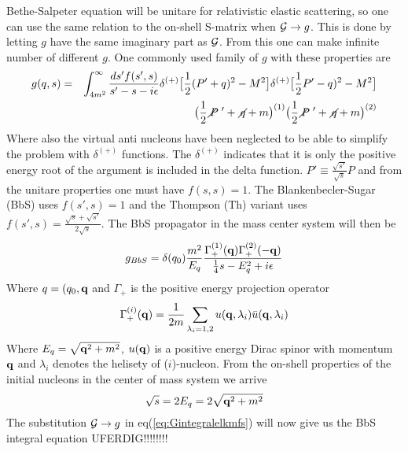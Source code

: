 Bethe-Salpeter equation will be unitare for relativistic elastic scattering, so one can use the same relation to
the on-shell S-matrix when ${\cal G}\to{g}$. This is done by letting $g$ have the same imaginary part as
${\cal G}$. From this one can make infinite number of different $g$. One commonly used family
of $g$ with these properties are
\begin{eqnarray}
g(q,s)&=&
\int^\infty_{4m^2}\frac{ds'f(s',s)}{s'-s-i\epsilon}\delta^{(+)}
\big[\frac{1}{2}(P'+q)^2-M^2\big]  \delta^{(+)}\big[\frac{1}{2}P'-q)^2-M^2\big]\nonumber\\
&&
\big(\frac{1}{2} \diagup\!\!\!\!P\;'+\diagup\!\!\!\! q+m\big)^{(1)}     \big(\frac{1}{2} \diagup\!\!\!\! P\;'+
\diagup\!\!\!\! q+m\big)^{(2)}
\end{eqnarray}
Where also the virtual anti nucleons have been neglected to be able to simplify the problem with $\delta^{(+)}$
functions. The $\delta^{(+)}$ indicates that it is only the positive energy root of the argument is included in the delta function.
$P'\equiv\frac{\sqrt{s'}}{\sqrt{s}}P$ and from the unitare properties one must have $f(s,s)=1$.
The Blankenbecler-Sugar (BbS) uses $f(s',s)=1$ and the Thompson (Th) variant uses $f(s',s)=\frac{\sqrt{s}+\sqrt{s'}}{2\sqrt{s}}$.
The BbS propagator in the mass center system will then be
\begin{equation}
g_{BbS}=\delta(q_0)\frac{m^2}{E_q}\frac{\Gamma^{(1)}_+({{\bf q}})\Gamma^{(2)}_+(-{{\bf q}})}{\frac{1}{4}s-E^2_q+i\epsilon}
\end{equation}
Where $q=(q_0,{\bf q}$ and $\Gamma_+$ is the positive energy projection operator
\begin{equation}
\Gamma^{(i)}_+({{\bf q}})=\frac{1}{2m}\sum_{\lambda_i=1,2} u({{\bf q}},\lambda_i)\bar{u}({{\bf q}},\lambda_i)
\end{equation}  
Where $E_q=\sqrt{{{\bf q}}^2+m^2}$, $u({{\bf q}})$ is a positive energy Dirac spinor with momentum ${{\bf q}}$ and
$\lambda_i$ denotes the helisety of ($i$)-nucleon.
From the on-shell properties of the
initial nucleons in the center of mass system
we arrive 
\begin{equation}
\sqrt{s}=2E_q=2\sqrt{{{\bf q}}^2+m^2}
\end{equation}  
The substitution ${\cal G}\to{g}$ in eq(\ref{eq:Gintegralelkmfs}) will now give us the BbS integral equation
UFERDIG!!!!!!!!







